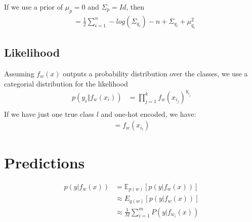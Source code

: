 \documentclass[a4paper]{scrartcl}
\begin{document}
    If we use a prior of $\mu_p=0$ and $\Sigma_p=Id$, then
    \begin{align}
        &= \frac{1}{2} \sum_{i=1}^n - log(\Sigma_{q_i}) - n + \Sigma_{q_i} +  \mu_{q_i}^2
    \end{align}
        

\subsection{Likelihood}
    Assuming $f_w(x)$ outputs a probability distribution over the classes, we use a categorial distribution for the likelihood
    \begin{align*}
        p(y_i \Vert f_w(x_i))
        &= \prod_{j=1}^k f_w(x_{i_j})^{y_{i_j}} \\
    \end{align*}
    If we have just one true class $l$ and one-hot encoded, we have:
    \begin{align*}
        = f_w(x_{i_l})
    \end{align*}

\section{Predictions}
\begin{align*}
    p(y \vert f_w(x)) 
    &= \mathbb{E}_{p(w)}[p(y \vert f_w(x))]\\
    &\approx E_{q(w)}[p(y \vert f_w(x))]\\
    &\approx \frac{1}{M}\sum_{i=1}^m P(y \vert f_{w_i}(x))
\end{align*}
\end{document}
